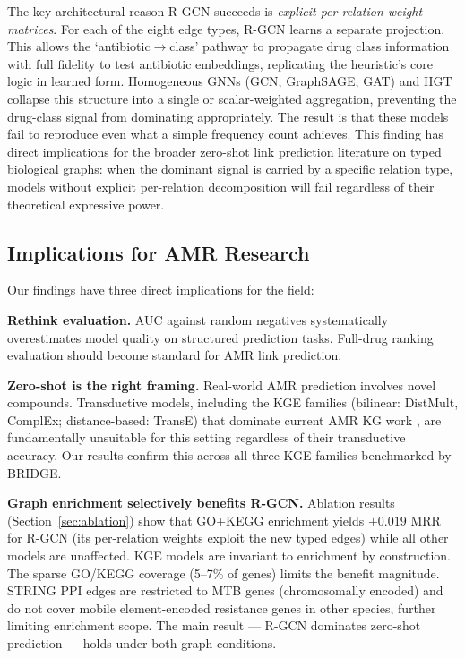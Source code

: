 \documentclass[conference]{IEEEtran}
\begin{document}
The key architectural reason R-GCN succeeds is \textit{explicit per-relation weight matrices}. For each of the eight edge types, R-GCN learns a separate projection. This allows the `antibiotic$\to$class' pathway to propagate drug class information with full fidelity to test antibiotic embeddings, replicating the heuristic's core logic in learned form. Homogeneous GNNs (GCN, GraphSAGE, GAT) and HGT collapse this structure into a single or scalar-weighted aggregation, preventing the drug-class signal from dominating appropriately. The result is that these models fail to reproduce even what a simple frequency count achieves. This finding has direct implications for the broader zero-shot link prediction literature on typed biological graphs: when the dominant signal is carried by a specific relation type, models without explicit per-relation decomposition will fail regardless of their theoretical expressive power.

\subsection{Implications for AMR Research}

Our findings have three direct implications for the field:

\textbf{Rethink evaluation.} AUC against random negatives systematically overestimates model quality on structured prediction tasks. Full-drug ranking evaluation should become standard for AMR link prediction.

\textbf{Zero-shot is the right framing.} Real-world AMR prediction involves novel compounds. Transductive models, including the KGE families (bilinear: DistMult, ComplEx; distance-based: TransE) that dominate current AMR KG work \cite{youn2022kids, bessadok2026bridge}, are fundamentally unsuitable for this setting regardless of their transductive accuracy. Our results confirm this across all three KGE families benchmarked by BRIDGE.

\textbf{Graph enrichment selectively benefits R-GCN.} Ablation results (Section~\ref{sec:ablation}) show that GO+KEGG enrichment yields $+0.019$ MRR for R-GCN (its per-relation weights exploit the new typed edges) while all other models are unaffected. KGE models are invariant to enrichment by construction. The sparse GO/KEGG coverage (5--7\% of genes) limits the benefit magnitude. STRING PPI edges are restricted to MTB genes (chromosomally encoded) and do not cover mobile element-encoded resistance genes in other species, further limiting enrichment scope. The main result --- R-GCN dominates zero-shot prediction --- holds under both graph conditions.
\end{document}
